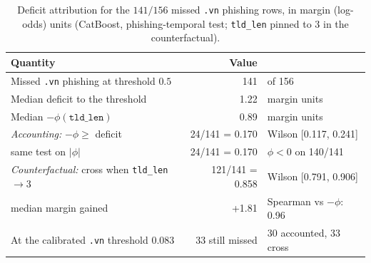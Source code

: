 \begin{table}[t]
\centering
\caption{Deficit attribution for the $141/156$ missed \texttt{.vn} phishing rows, in
margin (log-odds) units (CatBoost, phishing-temporal test; \texttt{tld\_len} pinned to
$3$ in the counterfactual).}
\label{tab:vndeficit}
\small\setlength{\tabcolsep}{4pt}
\begin{tabular}{l r l}
\toprule
Quantity & Value & \\
\midrule
Missed \texttt{.vn} phishing at threshold $0.5$ & 141 & of 156 \\
Median deficit to the threshold & 1.22 & margin units \\
Median $-\phi(\texttt{tld\_len})$ & 0.89 & margin units \\
\emph{Accounting:} $-\phi \geq$ deficit & 24/141 = 0.170 & {\scriptsize Wilson [0.117, 0.241]} \\
\quad same test on $|\phi|$ & 24/141 = 0.170 & {\scriptsize $\phi<0$ on 140/141} \\
\emph{Counterfactual:} cross when \texttt{tld\_len}$\to3$ & 121/141 = 0.858 & {\scriptsize Wilson [0.791, 0.906]} \\
\quad median margin gained & +1.81 & {\scriptsize Spearman vs $-\phi$: 0.96} \\
At the calibrated \texttt{.vn} threshold $0.083$ & 33 still missed & {\scriptsize 30 accounted, 33 cross} \\
\bottomrule
\end{tabular}
\end{table}
